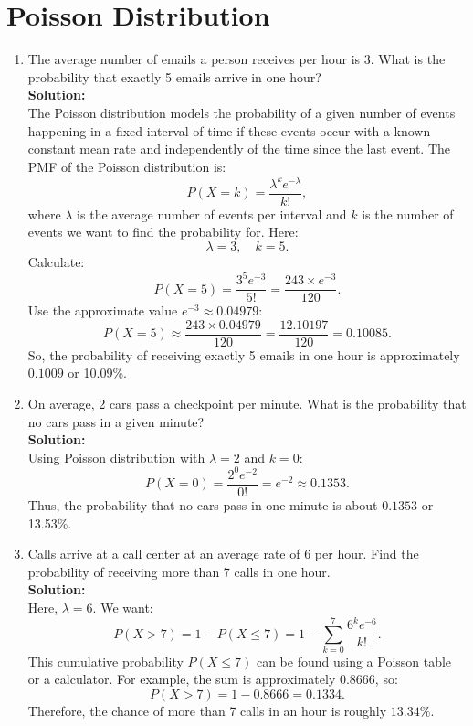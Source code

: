 \documentclass{book}
\begin{document}
\section*{Poisson Distribution}

\begin{enumerate}[label=Exercise \arabic*:]
    \item The average number of emails a person receives per hour is 3. What is the probability that exactly 5 emails arrive in one hour? \\
    \textbf{Solution:} \\
    The Poisson distribution models the probability of a given number of events happening in a fixed interval of time if these events occur with a known constant mean rate and independently of the time since the last event. The PMF of the Poisson distribution is:
    \[
    P(X = k) = \frac{\lambda^k e^{-\lambda}}{k!},
    \]
    where \(\lambda\) is the average number of events per interval and \(k\) is the number of events we want to find the probability for. Here:
    \[
    \lambda = 3, \quad k = 5.
    \]
    Calculate:
    \[
    P(X=5) = \frac{3^5 e^{-3}}{5!} = \frac{243 \times e^{-3}}{120}.
    \]
    Use the approximate value \(e^{-3} \approx 0.04979\):
    \[
    P(X=5) \approx \frac{243 \times 0.04979}{120} = \frac{12.10197}{120} = 0.10085.
    \]
    So, the probability of receiving exactly 5 emails in one hour is approximately \(\boxed{0.1009}\) or 10.09\%.

    \item On average, 2 cars pass a checkpoint per minute. What is the probability that no cars pass in a given minute? \\
    \textbf{Solution:} \\
    Using Poisson distribution with \(\lambda = 2\) and \(k=0\):
    \[
    P(X=0) = \frac{2^0 e^{-2}}{0!} = e^{-2} \approx 0.1353.
    \]
    Thus, the probability that no cars pass in one minute is about \(\boxed{0.1353}\) or 13.53\%.

    \item Calls arrive at a call center at an average rate of 6 per hour. Find the probability of receiving more than 7 calls in one hour. \\
    \textbf{Solution:} \\
    Here, \(\lambda = 6\). We want:
    \[
    P(X > 7) = 1 - P(X \leq 7) = 1 - \sum_{k=0}^7 \frac{6^k e^{-6}}{k!}.
    \]
    This cumulative probability \(P(X \leq 7)\) can be found using a Poisson table or a calculator. For example, the sum is approximately 0.8666, so:
    \[
    P(X > 7) = 1 - 0.8666 = 0.1334.
    \]
    Therefore, the chance of more than 7 calls in an hour is roughly \(\boxed{13.34\%}\).
\end{enumerate}
\end{document}
